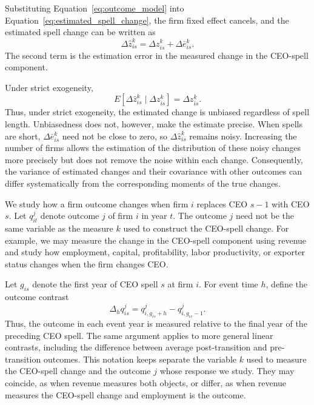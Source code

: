 \documentclass[sigconf,nonacm]{acmart}
\begin{document}
Substituting Equation~\eqref{eq:outcome_model} into
Equation~\eqref{eq:estimated_spell_change}, the firm fixed effect
cancels, and the estimated spell change can be written as
\begin{equation}
\Delta\widehat z_{is}^{k}
=
\Delta z_{is}^{k}
+
\Delta\bar e_{is}^{k}.
\label{eq:spell_change_error}
\end{equation}
The second term is the estimation error in the measured change in the CEO-spell component.

Under strict exogeneity,
\begin{equation}
E\!\left[
\Delta\widehat z_{is}^{k}
\mid
\Delta z_{is}^{k}
\right]
=
\Delta z_{is}^{k}.
\label{eq:unbiased_spell_change}
\end{equation}
Thus, under strict exogeneity, the estimated change is unbiased regardless of spell length. Unbiasedness does not, however, make the estimate precise. When spells are short, $\Delta\bar e_{is}^{k}$ need not be close to zero, so $\Delta\widehat z_{is}^{k}$ remains noisy. Increasing the number of firms allows the estimation of the distribution of these noisy changes more precisely but does not remove the noise within each change. Consequently, the variance of estimated changes and their covariance with other outcomes can differ systematically from the corresponding moments of the true changes.

We study how a firm outcome changes when firm $i$ replaces CEO 
$s-1$ with CEO $s$. Let $q_{it}^{j}$ denote outcome $j$ of firm $i$ in
year $t$. The outcome $j$ need not be the same variable as the measure
$k$ used to construct the CEO-spell change. For example, we may measure
the change in the CEO-spell component using revenue and study how
employment, capital, profitability, labor productivity, or exporter
status changes when the firm changes CEO.

Let $g_{is}$ denote the first year of CEO spell $s$ at firm $i$. For
event time $h$, define the outcome contrast
\begin{equation}
\Delta_h q_{is}^{j}
=
q_{i,g_{is}+h}^{j}
-
q_{i,g_{is}-1}^{j}.
\label{eq:outcome_contrast}
\end{equation}
Thus, the outcome in each event year is measured relative to the final
year of the preceding CEO spell. The same argument applies to more
general linear contrasts, including the difference between average
post-transition and pre-transition outcomes.
This notation keeps separate the variable $k$ used to measure the CEO-spell change and the outcome $j$ whose response we study. They may coincide, as when revenue measures both objects, or differ, as when revenue measures the CEO-spell change and employment is the outcome.
\end{document}
